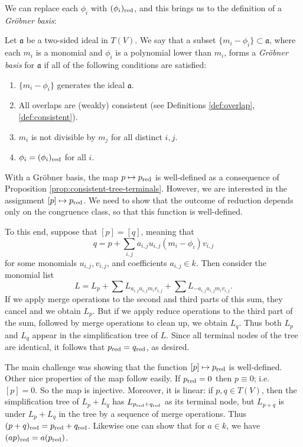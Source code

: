 We can replace each $\phi_i$ with $(\phi_i)_{\mathrm{red}}$, and this brings us to the definition of a \emph{Gr\"obner basis}:
\begin{defn}\label{def:grobner}
	Let $\mathfrak{a}$ be a two-sided ideal in $T(V)$. We say that a subset $\{m_i - \phi_i\}\subset \mathfrak{a}$, where each $m_i$ is a monomial and $\phi_i$ is a polynomial lower than $m_i$, forms a \emph{Gr\"obner basis} for $\mathfrak{a}$ if all of the following conditions are satisfied:
	\begin{enumerate}
		\item $\{m_i - \phi_i\}$ generates the ideal $\mathfrak{a}$.
		\item\label{item:grobnerconsistent} All overlaps are (weakly) consistent (see Definitions \ref{def:overlap}, \ref{def:consistent}).
		\item $m_i$ is not divisible by $m_j$ for all distinct $i,j$.
		\item $\phi_i = (\phi_i)_{\mathrm{red}}$ for all $i$.
	\end{enumerate}
\end{defn}
With a Gr\"obner basis, the map $p\mapsto p_{\mathrm{red}}$ is well-defined as a consequence of Proposition \ref{prop:consistent-tree-terminals}. However, we are interested in the assignment $[p]\mapsto p_{\mathrm{red}}$. We need to show that the outcome of reduction depends only on the congruence class, so that this function is well-defined.

To this end, suppose that $[p] = [q]$, meaning that
\[
	q = p + \sum_{i,j} a_{i,j}u_{i,j} (m_i - \phi_i) v_{i,j}
\]
for some monomials $u_{i,j}, v_{i,j}$, and coefficients $a_{i,j}\in k$. Then consider the monomial list
\[
	L= L_p + \sum L_{a_{i,j}u_{i,j}m_iv_{i,j}} + \sum L_{-a_{i,j}u_{i,j}m_i v_{i,j}}.
\]
If we apply merge operations to the second and third parts of this sum, they cancel and we obtain $L_p$. But if we apply reduce operations to the third part of the sum, followed by merge operations to clean up, we obtain $L_q$. Thus both $L_p$ and $L_q$ appear in the simplification tree of $L$. Since all terminal nodes of the tree are identical, it follows that $p_{\mathrm{red}} = q_{\mathrm{red}}$, as desired.

The main challenge was showing that the function $[p] \mapsto p_{\mathrm{red}}$ is well-defined. Other nice properties of the map follow easily. If $p_{\mathrm{red}} = 0$ then $p \equiv 0$; i.e. $[p]=0$. So the map is injective. Moreover, it is linear: if $p,q\in T(V)$, then the simplification tree of $L_p + L_q$ has $L_{p_{\mathrm{red}}+q_{\mathrm{red}}}$ as its terminal node, but $L_{p+q}$ is under $L_p + L_q$ in the tree by a sequence of merge operations. Thus $(p+q)_{\mathrm{red}} = p_{\mathrm{red}} + q_{\mathrm{red}}$. Likewise one can show that for $a \in k$, we have $(ap)_{\mathrm{red}} = a(p_{\mathrm{red}})$.

